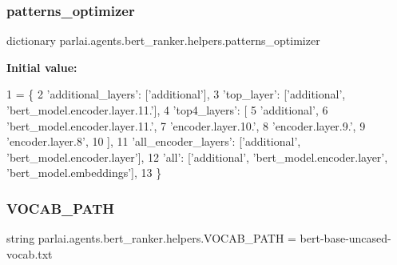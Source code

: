 \mbox{\label{namespaceparlai_1_1agents_1_1bert__ranker_1_1helpers_aebda7127ff111489042a68edcd62830f}} 
\subsubsection{\texorpdfstring{patterns\+\_\+optimizer}{patterns\_optimizer}}
{\footnotesize\ttfamily dictionary parlai.\+agents.\+bert\+\_\+ranker.\+helpers.\+patterns\+\_\+optimizer}

{\bfseries Initial value\+:}
\begin{DoxyCode}
1 =  \{
2     \textcolor{stringliteral}{'additional\_layers'}: [\textcolor{stringliteral}{'additional'}],
3     \textcolor{stringliteral}{'top\_layer'}: [\textcolor{stringliteral}{'additional'}, \textcolor{stringliteral}{'bert\_model.encoder.layer.11.'}],
4     \textcolor{stringliteral}{'top4\_layers'}: [
5         \textcolor{stringliteral}{'additional'},
6         \textcolor{stringliteral}{'bert\_model.encoder.layer.11.'},
7         \textcolor{stringliteral}{'encoder.layer.10.'},
8         \textcolor{stringliteral}{'encoder.layer.9.'},
9         \textcolor{stringliteral}{'encoder.layer.8'},
10     ],
11     \textcolor{stringliteral}{'all\_encoder\_layers'}: [\textcolor{stringliteral}{'additional'}, \textcolor{stringliteral}{'bert\_model.encoder.layer'}],
12     \textcolor{stringliteral}{'all'}: [\textcolor{stringliteral}{'additional'}, \textcolor{stringliteral}{'bert\_model.encoder.layer'}, \textcolor{stringliteral}{'bert\_model.embeddings'}],
13 \}
\end{DoxyCode}
\mbox{\label{namespaceparlai_1_1agents_1_1bert__ranker_1_1helpers_a88c47b25646aed4d2d140a159443bb7c}} 
\subsubsection{\texorpdfstring{V\+O\+C\+A\+B\+\_\+\+P\+A\+TH}{VOCAB\_PATH}}
{\footnotesize\ttfamily string parlai.\+agents.\+bert\+\_\+ranker.\+helpers.\+V\+O\+C\+A\+B\+\_\+\+P\+A\+TH = \textquotesingle{}bert-\/base-\/uncased-\/vocab.\+txt\textquotesingle{}}

